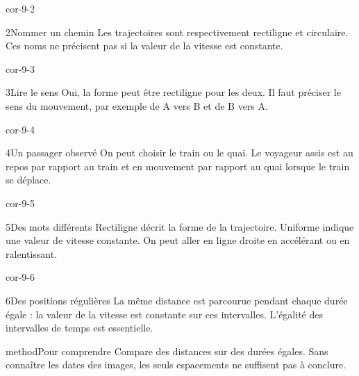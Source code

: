 \documentclass[12pt,twoside,openany]{book}
\begin{document}
\begin{blocLivre}{cor-9-2}
\begin{corrige}{2}{Nommer un chemin}
Les trajectoires sont respectivement rectiligne et circulaire. Ces noms ne précisent pas si la valeur de la vitesse est constante.\par
\end{corrige}\end{blocLivre}
\begin{blocLivre}{cor-9-3}
\begin{corrige}{3}{Lire le sens}
Oui, la forme peut être rectiligne pour les deux. Il faut préciser le sens du mouvement, par exemple de A vers B et de B vers A.\par
{}
\end{corrige}\end{blocLivre}
\begin{blocLivre}{cor-9-4}
\begin{corrige}{4}{Un passager observé}
On peut choisir le train ou le quai. Le voyageur assis est au repos par rapport au train et en mouvement par rapport au quai lorsque le train se déplace.\par
{}
\end{corrige}\end{blocLivre}
\begin{blocLivre}{cor-9-5}
\begin{corrige}{5}{Des mots différents}
Rectiligne décrit la forme de la trajectoire. Uniforme indique une valeur de vitesse constante. On peut aller en ligne droite en accélérant ou en ralentissant.\par
\end{corrige}\end{blocLivre}
\begin{blocLivre}{cor-9-6}
\begin{corrige}{6}{Des positions régulières}
La même distance est parcourue pendant chaque durée égale : la valeur de la vitesse est constante sur ces intervalles. L’égalité des intervalles de temps est essentielle.\par
\begin{pcEncadre}{method}{Pour comprendre}
Compare des distances sur des durées égales. Sans connaître les dates des images, les seuls espacements ne suffisent pas à conclure.\par
\end{pcEncadre}
\end{corrige}\end{blocLivre}
\end{document}
